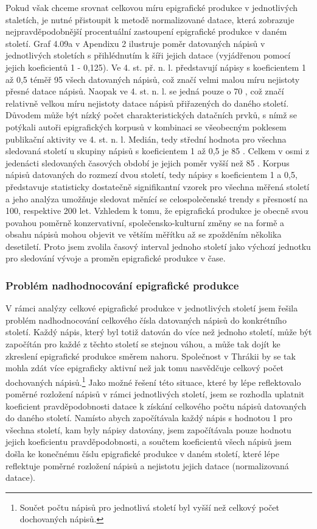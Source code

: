 Pokud však chceme srovnat celkovou míru epigrafické produkce v jednotlivých staletích, je nutné přistoupit k metodě normalizované datace, která zobrazuje nejpravděpodobnější procentuální zastoupení epigrafické produkce v daném století. Graf 4.09a v Apendixu 2 ilustruje poměr datovaných nápisů v jednotlivých stoletích s přihlédnutím k šíři jejich datace (vyjádřenou pomocí jejich koeficientů 1 - 0,125). Ve 4. st. př. n. l. představují nápisy s koeficientem 1 až 0,5 téměř 95  všech datovaných nápisů, což značí velmi malou míru nejistoty přesné datace nápisů. Naopak ve 4. st. n. l. se jedná pouze o 70 , což značí relativně velkou míru nejistoty datace nápisů přiřazených do daného století. Důvodem může být nízký počet charakteristických datačních prvků, s nímž se potýkali autoři epigrafických korpusů v kombinaci se všeobecným poklesem publikační aktivity ve 4. st. n. l. Medián, tedy střední hodnota pro všechna sledovaná století u skupiny nápisů s koeficientem 1 až 0,5 je 85 . Celkem v osmi z jedenácti sledovaných časových období je jejich poměr vyšší než 85 . Korpus nápisů datovaných do rozmezí dvou století, tedy nápisy s koeficientem 1 a 0,5, představuje statisticky dostatečně signifikantní vzorek pro všechna měřená století a jeho analýza umožňuje sledovat měnící se celospolečenské trendy s přesností na 100, respektive 200 let. Vzhledem k tomu, že epigrafická produkce je obecně svou povahou poměrně konzervativní, společensko-kulturní změny se na formě a obsahu nápisů mohou objevit ve větším měřítku až se zpožděním několika desetiletí. Proto jsem zvolila časový interval jednoho století jako výchozí jednotku pro sledování vývoje a proměn epigrafické produkce v čase.

\subsubsection[problém-nadhodnocování-epigrafické-produkce]{Problém nadhodnocování epigrafické produkce}

V rámci analýzy celkové epigrafické produkce v jednotlivých století jsem řešila problém nadhodnocování celkového čísla datovaných nápisů do konkrétního století. Každý nápis, který byl totiž datován do více než jednoho století, může být započítán pro každé z těchto století se stejnou váhou, a může tak dojít ke zkreslení epigrafické produkce směrem nahoru. Společnost v Thrákii by se tak mohla zdát více epigraficky aktivní než jak tomu nasvědčuje celkový počet dochovaných nápisů.\footnote{Součet počtu nápisů pro jednotlivá století byl vyšší než celkový počet dochovaných nápisů.} Jako možné řešení této situace, které by lépe reflektovalo poměrné rozložení nápisů v rámci jednotlivých století, jsem se rozhodla uplatnit koeficient pravděpodobnosti datace k získání celkového počtu nápisů datovaných do daného století. Namísto abych započítávala každý nápis s hodnotou 1 pro všechna století, kam byly nápisy datovány, jsem započítávala pouze hodnotu jejich koeficientu pravděpodobnosti, a součtem koeficientů všech nápisů jsem došla ke konečnému číslu epigrafické produkce v daném století, které lépe reflektuje poměrné rozložení nápisů a nejistotu jejich datace (normalizovaná datace).

